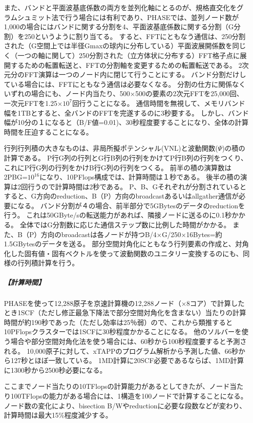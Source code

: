 また、バンドと平面波基底係数の両方を並列化軸にとるのが、規格直交化をグラムシュミット法で行う場合には有利であり、PHASEでは、並列ノード数が1,000の場合にはバンドに関する分割を4、平面波基底係数に関する分割（G分割）を250というように割り当てる。
すると、FFTにともなう通信は、250分割された（G空間上では半径Gmaxの球内に分布している）平面波展開係数を同じく（一つの軸に関して）250分割された（立方体状に分布する）FFT格子点に展開するための転置転送と、FFTの分割軸を変更するための転置転送である。
2次元分のFFT演算は一つのノード内に閉じて行うことにする。
バンド分割だけしている場合には、FFTにともなう通信は必要なくなる。
分割の仕方に関係なくいずれの場合にも、ノード内当たり、500×500の要素の2次元FFTを25,000回、一次元FFTを1.25×$10^7$回行うことになる。
通信時間を無視して、メモリバンド幅を1TBとすると、全バンドのFFTを完遂するのに3秒要する。
しかし、バンド幅が10分の１になると（B/F値=0.01)、30秒程度要することになり、全体の計算時間を圧迫することになる。

行列行列積の大きなものは、非局所擬ポテンシャル(VNL)と波動関数($\Psi$)の積の計算である。
P行G列の行列とG行B列の行列をかけてP行B列の行列をつくり、これにP行G列の行列をかけB行G列の行列をつくる。
前半の積の演算数は2PBG=$10^{16}$になり、10PFlops構成では、計算時間は１秒である。
後半の積の演算は2回行うので計算時間は2秒である。
P、B、Gそれぞれが分割されているとすると、G方向のreduction、B（P）方向のbroadcastあるいはallgather通信が必要になる。
バンド分割が４の場合、前半部分で5GBytesのデータのreductionを行う。
これは50GByte/sの転送能力があれば、隣接ノードに送るのに0.1秒かかる。
全体ではG分割数に応じた通信ステップ数に比例した時間がかかる。
また、B（P）方向のbroadcastは各ノードが持つB/4×G/250×16Bytes=約1.5GBytesのデータを送る。
部分空間対角化にともなう行列要素の作成と、対角化した固有値・固有ベクトルを使って波動関数のユニタリー変換するのにも、同様の行列積計算を行う。

\subparagraph{【計算時間】}
PHASEを使って12,288原子を京速計算機の12,288ノード（×8コア）で計算したとき1SCF（ただし修正最急下降法で部分空間対角化を含まない）当たりの計算時間が約190秒であった（ただし効率は25％弱）ので、これから類推すると10PFlopsクラスターでは1SCFに30秒程度かかることになる。
他のソルバーを使う場合や部分空間対角化法を使う場合には、60秒から100秒程度要すると予測される。
10,000原子に対して、xTAPPのプログラム解析から予測した値、66秒から127秒とほぼ一致している。
1MD計算に20SCF必要であるならば、1MD計算に1300秒から2500秒必要になる。

ここまでノード当たりの10TFlopsの計算能力があるとしてきたが、ノード当たり100TFlopsの能力がある場合には、1構造を100ノードで計算することになる。
ノード数の変化により、bisection B/Wやreductionに必要な段数などが変わり、計算時間は最大15\%程度減少する。

